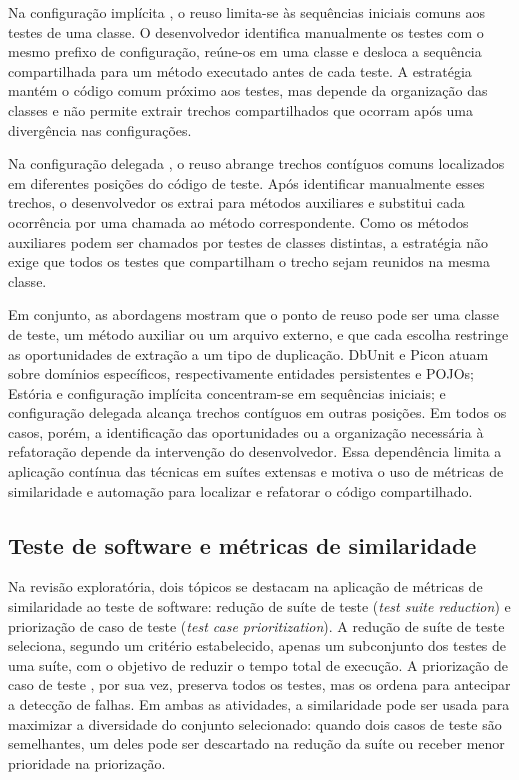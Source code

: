 Na configuração implícita \cite{meszaros:2007}, o reuso limita-se às sequências iniciais comuns aos testes de uma classe. O desenvolvedor identifica manualmente os testes com o mesmo prefixo de configuração, reúne-os em uma classe e desloca a sequência compartilhada para um método executado antes de cada teste. A estratégia mantém o código comum próximo aos testes, mas depende da organização das classes e não permite extrair trechos compartilhados que ocorram após uma divergência nas configurações.

Na configuração delegada \cite{meszaros:2007}, o reuso abrange trechos contíguos comuns localizados em diferentes posições do código de teste. Após identificar manualmente esses trechos, o desenvolvedor os extrai para métodos auxiliares e substitui cada ocorrência por uma chamada ao método correspondente. Como os métodos auxiliares podem ser chamados por testes de classes distintas, a estratégia não exige que todos os testes que compartilham o trecho sejam reunidos na mesma classe.

Em conjunto, as abordagens mostram que o ponto de reuso pode ser uma classe de teste, um método auxiliar ou um arquivo externo, e que cada escolha restringe as oportunidades de extração a um tipo de duplicação. DbUnit e Picon atuam sobre domínios específicos, respectivamente entidades persistentes e POJOs; Estória e configuração implícita concentram-se em sequências iniciais; e configuração delegada alcança trechos contíguos em outras posições. Em todos os casos, porém, a identificação das oportunidades ou a organização necessária à refatoração depende da intervenção do desenvolvedor. Essa dependência limita a aplicação contínua das técnicas em suítes extensas e motiva o uso de métricas de similaridade e automação para localizar e refatorar o código compartilhado.

\subsection{Teste de software e métricas de similaridade}

Na revisão exploratória, dois tópicos se destacam na aplicação de métricas de similaridade ao teste de software: redução de suíte de teste (\textit{test suite reduction}) e priorização de caso de teste (\textit{test case prioritization}). A redução de suíte de teste \cite{harrold:etal:1993} seleciona, segundo um critério estabelecido, apenas um subconjunto dos testes de uma suíte, com o objetivo de reduzir o tempo total de execução. A priorização de caso de teste \cite{wong:etal:1997}, por sua vez, preserva todos os testes, mas os ordena para antecipar a detecção de falhas. Em ambas as atividades, a similaridade pode ser usada para maximizar a diversidade do conjunto selecionado: quando dois casos de teste são semelhantes, um deles pode ser descartado na redução da suíte ou receber menor prioridade na priorização.

